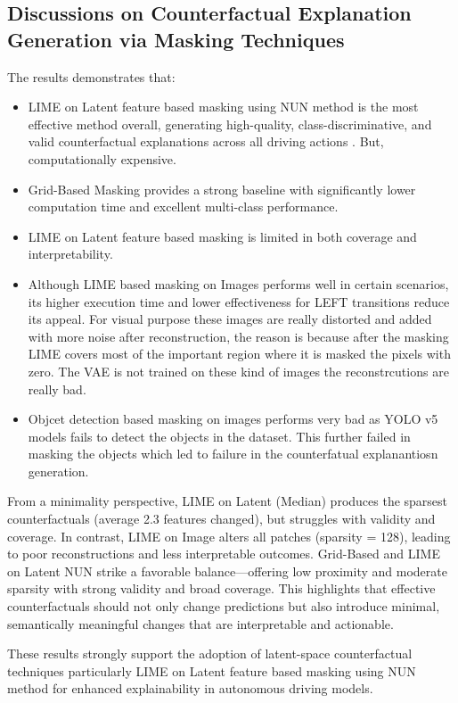 \subsection{Discussions on Counterfactual Explanation Generation via
Masking Techniques}
The results demonstrates that:
\begin{itemize}
    \item LIME on Latent feature based masking using NUN method is the most effective method overall, generating high-quality, class-discriminative, and valid counterfactual explanations across all driving actions . But, computationally expensive.
    \item Grid-Based Masking provides a strong baseline with significantly lower computation time and excellent multi-class performance.
    \item LIME on Latent feature based masking is limited in both coverage and interpretability.
    \item Although LIME based masking on Images performs well in certain scenarios, its higher execution time and lower effectiveness for LEFT transitions reduce its appeal. For visual purpose these images are really distorted and added with more noise after reconstruction, the reason is because after the masking LIME covers most of the important region where it is masked the pixels with zero. The VAE is not trained on these kind of images the reconstrcutions are really bad.
    \item Objcet detection based masking on images performs very bad as YOLO v5 models fails to detect the objects in the dataset. This further failed in masking the objects which led to failure in the counterfatual explanantiosn generation. 
\end{itemize}

From a minimality perspective, LIME on Latent (Median) produces the sparsest counterfactuals (average 2.3 features changed), but struggles with validity and coverage. In contrast, LIME on Image alters all patches (sparsity = 128), leading to poor reconstructions and less interpretable outcomes. Grid-Based and LIME on Latent NUN strike a favorable balance—offering low proximity and moderate sparsity with strong validity and broad coverage. This highlights that effective counterfactuals should not only change predictions but also introduce minimal, semantically meaningful changes that are interpretable and actionable.

These results strongly support the adoption of latent-space counterfactual techniques particularly LIME on Latent feature based masking using NUN method for enhanced explainability in autonomous driving models.











